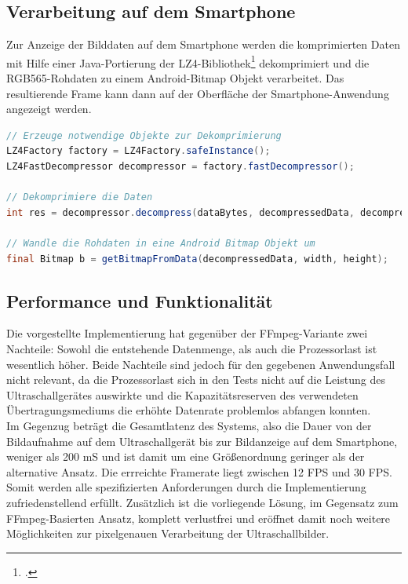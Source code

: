 \subsection{Verarbeitung auf dem Smartphone}
Zur Anzeige der Bilddaten auf dem Smartphone werden die komprimierten Daten mit Hilfe einer Java-Portierung der LZ4-Bibliothek\footcite{JPounzLZ4} dekomprimiert und die RGB565-Rohdaten zu einem Android-Bitmap Objekt verarbeitet. Das resultierende Frame kann dann auf der Oberfläche der Smartphone-Anwendung angezeigt werden.

\begin{lstlisting}[caption=Dekompression der Daten, label=lst:decompression, language=Java]
// Erzeuge notwendige Objekte zur Dekomprimierung
LZ4Factory factory = LZ4Factory.safeInstance();
LZ4FastDecompressor decompressor = factory.fastDecompressor();

// Dekomprimiere die Daten
int res = decompressor.decompress(dataBytes, decompressedData, decompressedData.length);

// Wandle die Rohdaten in eine Android Bitmap Objekt um
final Bitmap b = getBitmapFromData(decompressedData, width, height);
\end{lstlisting}

\subsection{Performance und Funktionalität}
Die vorgestellte Implementierung hat gegenüber der FFmpeg-Variante zwei Nachteile: Sowohl die entstehende Datenmenge, als auch die Prozessorlast ist wesentlich höher. Beide Nachteile sind jedoch für den gegebenen Anwendungsfall nicht relevant, da die Prozessorlast sich in den Tests nicht auf die Leistung des Ultraschallgerätes auswirkte und die Kapazitätsreserven des verwendeten Übertragungsmediums die erhöhte Datenrate problemlos abfangen konnten.\\
Im Gegenzug beträgt die Gesamtlatenz des Systems, also die Dauer von der Bildaufnahme auf dem Ultraschallgerät bis zur Bildanzeige auf dem Smartphone, weniger als 200 mS und ist damit um eine Größenordnung geringer als der alternative Ansatz. Die errreichte Framerate liegt zwischen 12 FPS und 30 FPS. Somit werden alle spezifizierten Anforderungen durch die Implementierung zufriedenstellend erfüllt. Zusätzlich ist die vorliegende Lösung, im Gegensatz zum FFmpeg-Basierten Ansatz, komplett verlustfrei und eröffnet damit noch weitere Möglichkeiten zur pixelgenauen Verarbeitung der Ultraschallbilder.

